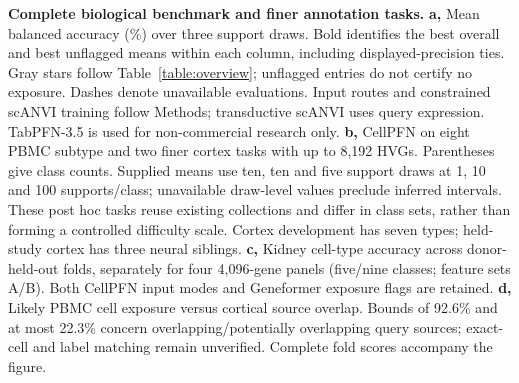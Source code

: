 \textbf{Complete biological benchmark and finer annotation tasks.}
\textbf{a,} Mean balanced accuracy (\%) over three support draws. Bold identifies the best overall and best unflagged means within each column, including displayed-precision ties. Gray stars follow Table~\ref{table:overview}; unflagged entries do not certify no exposure. Dashes denote unavailable evaluations. Input routes and constrained scANVI training follow Methods; transductive scANVI uses query expression. TabPFN-3.5 is used for non-commercial research only.
\textbf{b,} CellPFN on eight PBMC subtype and two finer cortex tasks with up to 8,192 HVGs. Parentheses give class counts. Supplied means use ten, ten and five support draws at 1, 10 and 100 supports/class; unavailable draw-level values preclude inferred intervals. These post hoc tasks reuse existing collections and differ in class sets, rather than forming a controlled difficulty scale. Cortex development has seven types; held-study cortex has three neural siblings.
\textbf{c,} Kidney cell-type accuracy across donor-held-out folds, separately for four 4,096-gene panels (five/nine classes; feature sets A/B). Both CellPFN input modes and Geneformer exposure flags are retained.
\textbf{d,} Likely PBMC cell exposure versus cortical source overlap. Bounds of 92.6\% and at most 22.3\% concern overlapping/potentially overlapping query sources; exact-cell and label matching remain unverified. Complete fold scores accompany the figure.
